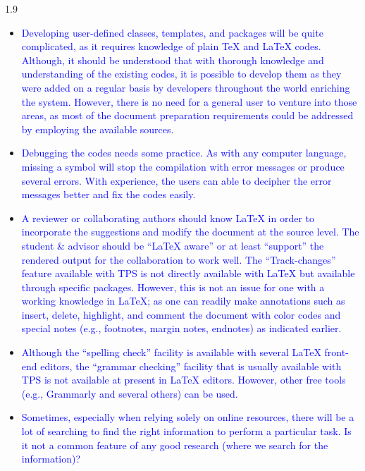 \documentclass[phd]{ndsu-thesis-2022}
\newcommand\myspacing{1.9} %
\newcommand\italk[1]{\textcolor{blue}{#1}}  %
\newcommand\lx{\LaTeX\xspace}
\newcommand\tx{\TeX\xspace}
\begin{document}
\begin{spacing}{\myspacing}
\begin{itemize}[leftmargin=*, itemsep=0pt, parsep=3pt]
\item \italk{Developing user-defined classes, templates, and packages will be quite complicated, as it requires knowledge of plain \tx and \lx codes. Although, it should be understood that with thorough knowledge and understanding of the existing codes, it is possible to develop them as they were added on a regular basis by developers throughout the world enriching the system. However, there is no need for a general user to venture into those areas, as most of the document preparation requirements could be addressed by employing the available sources.} 

\item \italk{Debugging the codes needs some practice. As with any computer language, missing a symbol will stop the compilation with error messages or produce several errors. With experience, the users can able to decipher the error messages better and fix the codes easily.}  

\item \italk{A reviewer or collaborating authors should know \lx in order to incorporate the suggestions and modify the document at the source level. The student \& advisor should be ``\lx aware'' or at least ``support'' the rendered output for the collaboration to work well.  The ``Track-changes'' feature available with TPS is not directly available with \lx but available through specific packages. However, this is not an issue for one with a working knowledge in \lx; as one can readily make annotations such as insert, delete, highlight, and comment the document with color codes and special notes (e.g., footnotes, margin notes, endnotes) as indicated earlier.} 

\item \italk{Although the ``spelling check'' facility is available with several \lx front-end editors, the ``grammar checking'' facility that is usually available with TPS is not available at present in \lx editors. However, other free tools (e.g., Grammarly and several others) can be used.}  

\item \italk{Sometimes, especially when relying solely on online resources, there will be a lot of searching to find the right information to perform a particular task. Is it not a common feature of any good research (where we search for the information)?} 

\end{itemize}


\end{spacing}
\end{document}
